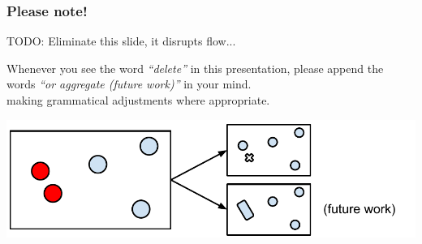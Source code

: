 \documentclass{beamer}
\begin{document}


\frame
{
  \frametitle{Please note!}
  TODO: Eliminate this slide, it disrupts flow...
  
  Whenever you see the word \emph{``delete''} in this presentation, please append the words \emph{``or aggregate (future work)''} in your mind. \\
  making grammatical adjustments where appropriate.
  
  \begin{center}
  \includegraphics[scale=0.50]{figs/cvl-delete-aggregate.pdf}
  \end{center}
}
\end{document}
